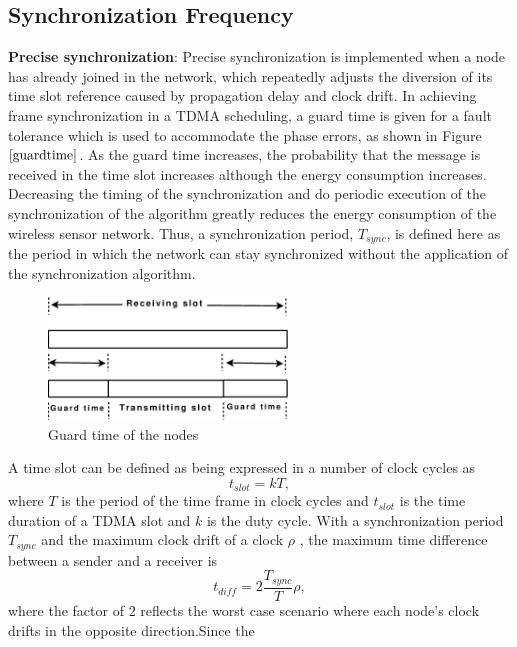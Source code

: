 \documentclass[journal]{IEEEtran}
\begin{document}
\subsection{\textbf{Synchronization Frequency}}
\textbf{Precise synchronization}: Precise synchronization is implemented when a node has already joined in the network, which repeatedly adjusts the diversion of its time slot reference caused by propagation delay and clock drift. 
In achieving frame synchronization in a TDMA scheduling, a guard
time is given for a fault tolerance which is used to accommodate the
phase errors, as shown in Figure $\ref{guardtime}$.  As the guard time increases,
the probability that the message is received in the time slot
increases although the energy consumption increases.
\newline Decreasing the timing of the synchronization and do periodic
execution of the synchronization of the algorithm greatly reduces
the energy consumption of the wireless
sensor network. Thus, a synchronization period, $T_{sync}$, is
defined here as the period in which the network can stay
synchronized without the application of the synchronization
algorithm.
\begin{figure}
\centering
\includegraphics[width=2.5in]{guardtime}
\caption{Guard time of the nodes} \label{guardtime}
\end{figure}
\newline A time slot can be defined as being expressed in a
number of clock cycles as
\begin{equation}
t_{slot} = kT ,
\end{equation} where $T$ is the period of the time frame in clock cycles and
$t_{slot}$ is the time duration of a TDMA slot and $k$ is the duty
cycle.
\newline With a synchronization period $T_{sync}$ and the
maximum clock drift of a clock $\rho$ , the maximum time difference
between a sender and a receiver is
\begin{equation}
t_{diff} = 2\frac{T_{sync}}{T}\rho ,
\end{equation}
where the factor of $2$ reflects the worst case scenario where each
node's clock drifts in the opposite direction.\newline Since the
\end{document}
